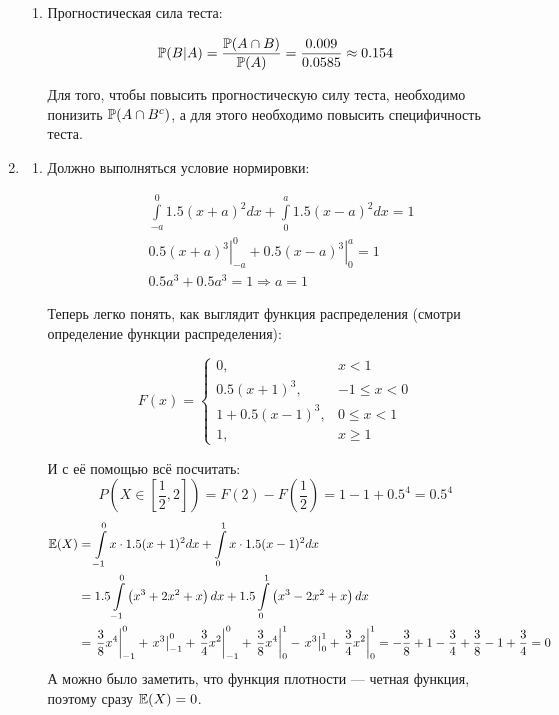 \begin{enumerate}
\begin{enumerate}
\item Прогностическая сила теста:

\[
\P(B | A) = \frac{\P(A \cap B)}{\P(A) } = \frac{0.009}{0.0585} \approx 0.154
\]

Для того, чтобы повысить прогностическую силу теста, необходимо понизить
$\P(A \cap B^c) $, а для этого необходимо повысить специфичность теста.
\end{enumerate}

\item
\begin{enumerate}
\item
Должно выполняться условие нормировки:

\begin{align*}
& \int \limits_{-a}^0 1.5(x+a)^2 dx + \int \limits_0^a 1.5(x- a)^2  dx = 1   \\
& \left. 0.5(x+a)^3 \right|_{-a}^0 + \left. 0.5(x- a)^3 \right|_0^a  = 1  \\
& 0.5a^3 + 0.5a^3 = 1 \Rightarrow a = 1
\end{align*}

Теперь легко понять, как выглядит функция распределения (смотри определение функции распределения):

\[
F(x) = \begin{cases}
0, & x < 1 \\
0.5 (x+1)^3, & -1 \leqslant x <0 \\
1 + 0.5 (x-1)^3, & 0 \leqslant x < 1 \\
1, & x \geqslant 1
\end{cases}
\]

И с её помощью всё посчитать:
\[
P\left(X \in \left[\frac{1}{2}, 2 \right]  \right) = F(2) - F\left(\frac{1}{2} \right) =
1 - 1 +0.5^4 = 0.5^4
\]
\begin{align*}
\E(X) &= \int \limits_{-1}^0 x \cdot 1.5 (x + 1)^2 dx +  \int \limits_0^1 x \cdot 1.5 (x - 1)^2 dx \\
& = 1.5 \int \limits_{-1}^0\left( x^3 + 2x^2 + x\right) dx + 1.5 \int \limits_0^1\left( x^3 -2x^2 + x\right) dx \\
& =  \left. \frac{3}{8} x^4 \right|_{-1}^0 + \left. x^3 \right|_{-1}^0 +
\left. \frac{3}{4} x^2\right|_{-1}^0 + \left. \frac{3}{8} x^4 \right|_0^1 -
\left. x^3 \right|_0^1 + \left. \frac{3}{4} x^2 \right|_0^1  = - \frac{3}{8} +
1 - \frac{3}{4} + \frac{3}{8} - 1 +\frac{3}{4} = 0
\end{align*}
А можно было заметить, что функция плотности — четная функция, поэтому сразу $\E(X) = 0$.


\end{enumerate}
\end{enumerate}
